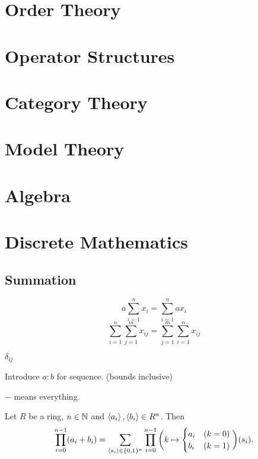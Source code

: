 \documentclass{report}
\begin{document}
\part{Order Theory}
\setcounter{chapter}{0} %


\part{Operator Structures}
\setcounter{chapter}{0} %


\part{Category Theory}
\setcounter{chapter}{0} %


\part{Model Theory}
\setcounter{chapter}{0} %


\part{Algebra}
\setcounter{chapter}{0} %


\part{Discrete Mathematics}
\setcounter{chapter}{0} %
\chapter{Summation}
\[ a\sum_{i=1}^n x_i = \sum_{i=1}^n ax_i \]
\[ \sum_{i=1}^n\sum_{j=1}^m x_{ij} = \sum_{j=1}^m\sum_{i=1}^n x_{ij} \]

$\delta_{ij}$

Introduce $a:b$ for sequence. (bounds inclusive)

$-$ means everything.

\begin{proposition} \label{productOfSum}
Let $R$ be a ring, $n\in \mathbb{N}$ and $\left\langle a_i \right\rangle,\left\langle b_i \right\rangle\in R^n$. Then
\[ \prod_{i=0}^{n-1}(a_i + b_i) = \sum_{\left\langle s_i \right\rangle\in \{0,1\}^n}\prod_{i=0}^{n-1}\bigg(k\mapsto \begin{cases}
a_i & (k=0) \\ b_i & (k=1)
\end{cases}\bigg)(s_i). \]
\end{proposition}
\end{document}
